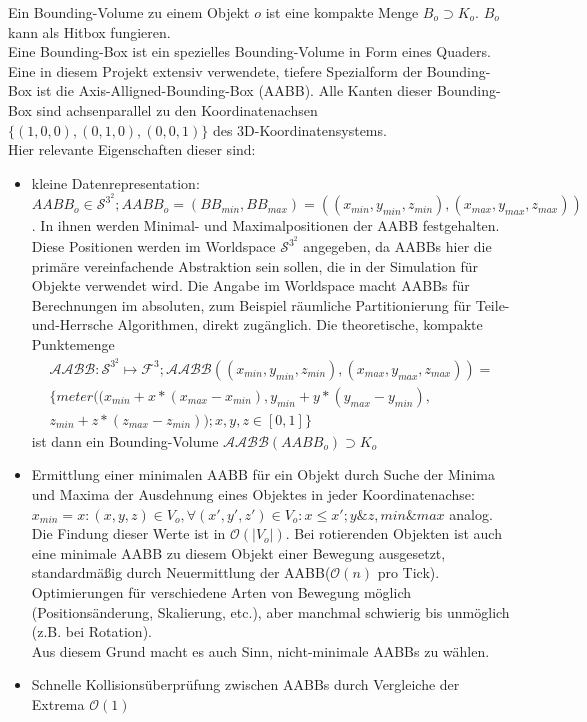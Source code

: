 Ein Bounding-Volume zu einem Objekt $o$ ist eine kompakte Menge $B_o \supset K_{o}$. $B_o$ kann als Hitbox fungieren.\\
Eine Bounding-Box ist ein spezielles Bounding-Volume in Form eines Quaders.\\
Eine in diesem Projekt extensiv verwendete, tiefere Spezialform der Bounding-Box ist die Axis-Alligned-Bounding-Box (AABB). Alle Kanten dieser Bounding-Box sind achsenparallel zu den Koordinatenachsen $\{(1,0,0), (0,1,0), (0,0,1)\}$ des 3D-Koordinatensystems.\\
Hier relevante Eigenschaften dieser sind:
\begin{itemize}
\item kleine Datenrepresentation:
		$$AABB_o \in \mathcal{S}^{3^2}; AABB_o = (BB_{min}, BB_{max}) = ((x_{min}, y_{min}, z_{min}), (x_{max}, y_{max}, z_{max}))$$.
		 In ihnen werden Minimal- und Maximalpositionen der AABB festgehalten.
		 Diese Positionen werden im Worldspace $\mathcal{S}^{3^2}$ angegeben, da AABBs hier die primäre vereinfachende Abstraktion sein sollen, die in der Simulation für Objekte verwendet wird. Die Angabe im Worldspace macht AABBs für Berechnungen im absoluten, zum Beispiel räumliche Partitionierung für Teile-und-Herrsche Algorithmen, direkt zugänglich.
		 Die theoretische, kompakte Punktemenge 
		 \begin{align*}
		 \mathcal{AABB}: \mathcal{S}^{3^2} \mapsto \mathcal{F}^3;
		 \mathcal{AABB} ((x_{min}, y_{min}, z_{min}), (x_{max}, y_{max}, z_{max})) = \\
		 \{meter((x_{min} + x * (x_{max} - x_{min}), y_{min} + y * (y_{max} - y_{min}),\\
		  z_{min} + z * (z_{max} - z_{min})); x, y, z \in [0,1] \} 
		 \end{align*}
		 ist dann ein Bounding-Volume $\mathcal{AABB}(AABB_o) \supset K_o$
	\item Ermittlung einer minimalen AABB für ein Objekt durch Suche der Minima und Maxima der Ausdehnung eines Objektes in jeder Koordinatenachse:
	 $x_{min} = x : (x, y, z) \in V_o , \forall (x', y', z') \in V_o: x \leq x'; y \& z, min \& max $ analog.
	 Die Findung dieser Werte ist in $ \mathcal{O}(|V_o|) $.
		Bei rotierenden Objekten ist auch eine minimale AABB zu diesem Objekt einer Bewegung ausgesetzt, standardmäßig durch Neuermittlung der AABB($\mathcal{O}(n)$ pro Tick). Optimierungen für verschiedene Arten von Bewegung möglich (Positionsänderung, Skalierung, etc.), aber manchmal schwierig bis unmöglich (z.B. bei Rotation).\\
		Aus diesem Grund macht es auch Sinn, nicht-minimale AABBs zu wählen.
	\item Schnelle Kollisionsüberprüfung zwischen AABBs durch Vergleiche der Extrema $\mathcal{O}(1)$
	
\end{itemize}

